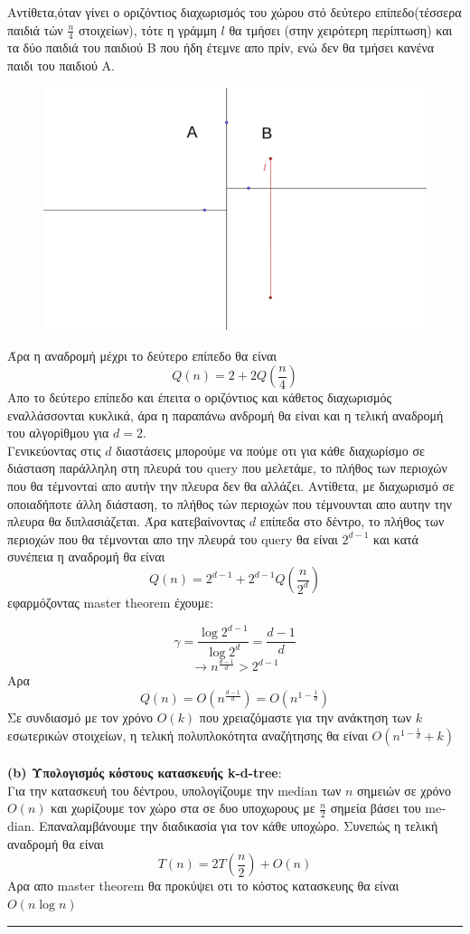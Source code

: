 \documentclass[12pt]{article}
\begin{document}
Αντίθετα,όταν γίνει ο οριζόντιος διαχωρισμός του χώρου στό δεύτερο επίπεδο(τέσσερα παιδιά τών $\frac{n}{4}$ στοιχείων), τότε η γράμμη $l$ θα τμήσει (στην χειρότερη περίπτωση) και τα δύο παιδιά του παιδιού B που ήδη έτεμνε απο πρίν, ενώ δεν θα τμήσει κανένα παιδι του παιδιού A.
\begin{figure}[H]
    \centering
    \includegraphics[scale = 0.1]{geogebra-export2.png}
\end{figure}
Άρα η αναδρομή μέχρι το δεύτερο επίπεδο θα είναι
$$Q(n) = 2 + 2Q(\frac{n}{4})$$
Απο το δεύτερο επίπεδο και έπειτα ο οριζόντιος και κάθετος διαχωρισμός εναλλάσσονται κυκλικά, άρα η παραπάνω ανδρομή θα είναι και η τελική αναδρομή του αλγορίθμου για $d=2$.\\
Γενικεύοντας στις $d$ διαστάσεις μπορούμε να πούμε οτι για κάθε διαχωρίσμο σε διάσταση παράλληλη στη πλευρά του \textlatin{query} που μελετάμε, το πλήθος των περιοχών που θα τέμνονταi απο αυτήν την πλευρα δεν θα αλλάζει. Αντίθετα,
με διαχωρισμό σε οποιαδήποτε άλλη διάσταση, το πλήθος τών περιοχών που τέμνουνται απο αυτην την πλευρα θα διπλασιάζεται. Άρα κατεβαίνοντας $d$ επίπεδα στο δέντρο, το πλήθος των περιοχών που θα τέμνονται απο 
την πλευρά του \textlatin{query} θα είναι $2^{d-1}$ και κατά συνέπεια η αναδρομή θα είναι 
$$Q(n) = 2^{d-1} + 2^{d-1}Q(\frac{n}{2^d})$$
εφαρμόζοντας \textlatin{master theorem} έχουμε:

$$\gamma = \frac{\log2^{d-1}}{\log2^d} = \frac{d-1}{d}$$
$$\rightarrow n^{\frac{d-1}{d}}>2^{d-1}$$
Aρα $$Q(n) = O(n^{\frac{d-1}{d}}) = O(n^{1-\frac{1}{d}}) $$ 
Σε συνδιασμό με τον χρόνο $O(k)$ που χρειαζόμαστε για την ανάκτηση των $k$ εσωτερικών στοιχείων, η τελική πολυπλοκότητα αναζήτησης θα είναι $Ο(n^{1-\frac{1}{d}}+k)$ \\ \\
{\bf (\textlatin{b}) Υπολογισμός κόστους κατασκευής  \textlatin{k-d-tree}}:\\
Για την κατασκευή του δέντρου, υπολογίζουμε την \textlatin{median} των $n$ σημειών σε χρόνο $O(n)$ και χωρίζουμε τον χώρο στα σε δυο υποχωρους με $\frac{n}{2}$ σημεία βάσει του \textlatin{median}. Επαναλαμβάνουμε την διαδικασία για τον κάθε υποχώρο. Συνεπώς η τελική αναδρομή θα είναι 
$$T(n) = 2T(\frac{n}{2}) + O(n)$$
Aρα απο \textlatin{master theorem} θα προκύψει οτι το κόστος κατασκευης θα είναι $Ο(n\log n)$\\
\rule{\textwidth}{.5pt}
\end{document}
